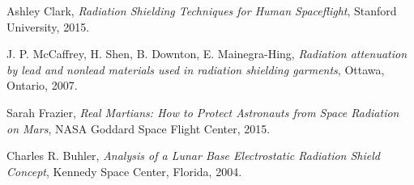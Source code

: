 \documentclass{article}
\begin{document}
\begin{thebibliography}{9}

    Ashley Clark,
    \textit{Radiation Shielding Techniques for Human Spaceflight},
    Stanford University,
    2015.

    J. P. McCaffrey, H. Shen, B. Downton, E. Mainegra-Hing,
    \textit{Radiation attenuation by lead and nonlead materials used in
    radiation shielding garments},
    Ottawa, Ontario,
    2007.

    Sarah Frazier,
    \textit{Real Martians: How to Protect Astronauts from Space Radiation on
    Mars},
    NASA Goddard Space Flight Center,
    2015.

    Charles R. Buhler,
    \textit{Analysis of a Lunar Base Electrostatic Radiation Shield Concept},
    Kennedy Space Center, Florida,
    2004.

\end{thebibliography}
\end{document}
